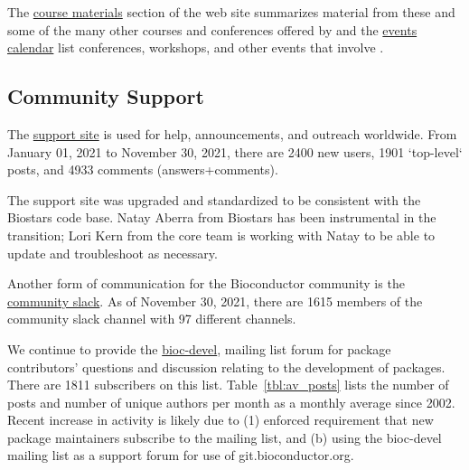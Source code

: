 \documentclass[letterpaper]{article}
\begin{document}
The \href{https://bioconductor.org/help/course-materials/}{course
  materials} section of the web site summarizes material from these
and some of the many other courses and conferences offered by
\Bioconductor and the \href{https://bioconductor.org/help/events/}{events
  calendar} list conferences, workshops, and other events that involve
\Bioconductor.



\subsection{Community Support}

The \Bioconductor{} \href{https://support.bioconductor.org}{support
  site} is used for help, announcements, and outreach worldwide. From January
01, 2021 to November 30, 2021, there are 2400 new users, 1901 `top-level` posts,
and 4933 comments (answers+comments). 

The support site was upgraded and standardized to be consistent with the
Biostars code base. Natay Aberra from Biostars has been instrumental in the
transition; Lori Kern from the core team is working with Natay to be able to
update and troubleshoot as necessary. 


Another form of communication for the Bioconductor community is the \Bioconductor{}
\href{https://community-bioc.slack.com}{community slack}. As of November 30,
2021, there are 1615 members of the community slack channel with 97 different channels.


We continue to provide the
\href{http://www.stat.math.ethz.ch/mailman/listinfo/bioc-devel}{bioc-devel},
mailing list forum for package contributors' questions and discussion
relating to the development of \Bioconductor{} packages. There are
1811 subscribers on this list. Table~\ref{tbl:av_posts} lists the number of
posts and number of unique authors per month as a monthly average since
2002. Recent increase in activity is likely due to (1) enforced requirement that
new package maintainers subscribe to the mailing list, and (b) using
the bioc-devel mailing list as a support forum for use of
git.bioconductor.org. 
\end{document}
